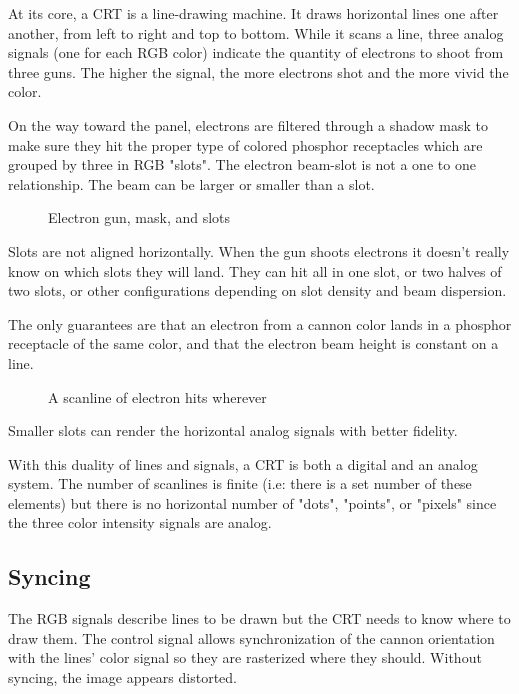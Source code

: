 At its core, a CRT is a line-drawing machine. It draws horizontal lines one after another, from left to right and top to bottom. While it scans a line, three analog signals (one for each RGB color) indicate the quantity of electrons to shoot from three guns. The higher the signal, the more electrons shot and the more vivid the color.


On the way toward the panel, electrons are filtered through a shadow mask to make sure they hit the proper type of colored phosphor receptacles which are grouped by three in RGB "slots". The electron beam-slot is not a one to one relationship. The beam can be larger or smaller than a slot.


\begin{figure}[H]
\caption*{Electron gun, mask, and slots}
\end{figure}

Slots are not aligned horizontally. When the gun shoots electrons it doesn't really know on which slots they will land. They can hit all in one slot, or two halves of two slots, or other configurations depending on slot density and beam dispersion. 

The only guarantees are that an electron from a cannon color lands in a phosphor receptacle of the same color, and that the electron beam height is constant on a line.

\begin{figure}[H]
\caption*{A scanline of electron hits wherever}
\end{figure}

Smaller slots can render the horizontal analog signals with better fidelity.





 With this duality of lines and signals, a CRT is both a digital and an analog system. The number of scanlines is finite (i.e: there is a set number of these elements) but there is no horizontal number of "dots", "points", or "pixels" since the three color intensity signals are analog.


\subsection{Syncing}
The RGB signals describe lines to be drawn but the CRT needs to know where to draw them. The control signal allows synchronization of the cannon orientation with the lines' color signal so they are rasterized where they should. Without syncing, the image appears distorted. 

